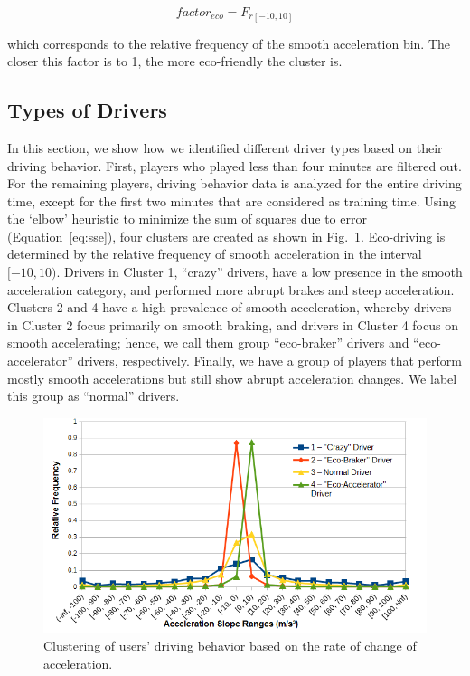 \documentclass[preprint,authoryear,12pt]{elsarticle}
\begin{document}
\begin{equation}\label{eq:factor-accel-slope}
factor_{eco} = F_{r[-10,10]}
\end{equation}

which corresponds to the relative frequency of the smooth acceleration bin. The closer this factor is to 1, the more eco-friendly the cluster is.


\subsection{Types of Drivers}

In this section, we show how we identified different driver types based on their driving behavior. First, players who played less than four minutes are filtered out. For the remaining players, driving behavior data is analyzed for the entire driving time, except for the first two minutes that are considered as training time.
Using the `elbow' heuristic to minimize the sum of squares due to error (Equation~\ref{eq:sse}), four clusters are created as shown in Fig.~\ref{fig:accel-ranges}.
Eco-driving is determined by the relative frequency of smooth acceleration in the interval $[-10,10)$. Drivers in Cluster 1, ``crazy'' drivers, have a low presence in the smooth acceleration category, and performed more abrupt brakes and steep acceleration.
Clusters 2 and 4 have a high prevalence of smooth acceleration, whereby drivers in Cluster 2 focus primarily on smooth braking, and drivers in Cluster 4 focus on smooth accelerating; hence, we call them group ``eco-braker'' drivers and ``eco-accelerator'' drivers, respectively. Finally, we have a group of players that perform mostly smooth accelerations but still show abrupt acceleration changes. We label this group as ``normal'' drivers.

\begin{figure}[tb]
	\begin{center}
		\includegraphics[width=1\linewidth]{ijhcs14-img/kmeansclustering}
		\caption{Clustering of users' driving behavior based on the rate of change of acceleration. \label{fig:accel-ranges}}
	\end{center}
\end{figure}
\end{document}
